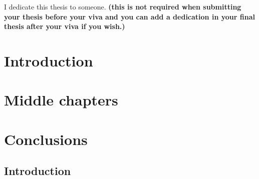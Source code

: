 \documentclass[twoside,12pt, a4paper]{report}
\begin{document}



I dedicate this thesis to someone. \textbf{(this is not required when submitting your thesis before your viva and you can add a dedication in your final thesis after your viva if you wish.)}

\clearpage



\clearpage



\clearpage



\clearpage



\clearpage

\tableofcontents

\clearpage

\listoffigures

\clearpage

\listoftables

\clearpage
\pagestyle{main}

\chapter{Introduction}




\chapter{Middle chapters}


\chapter{Conclusions}


\begin{appendices}

\chapter{Introduction}
\label{appendix_introduction}


\end{appendices}

\clearpage %
\printbibliography[heading=bibintoc,title=References]
\end{document}
